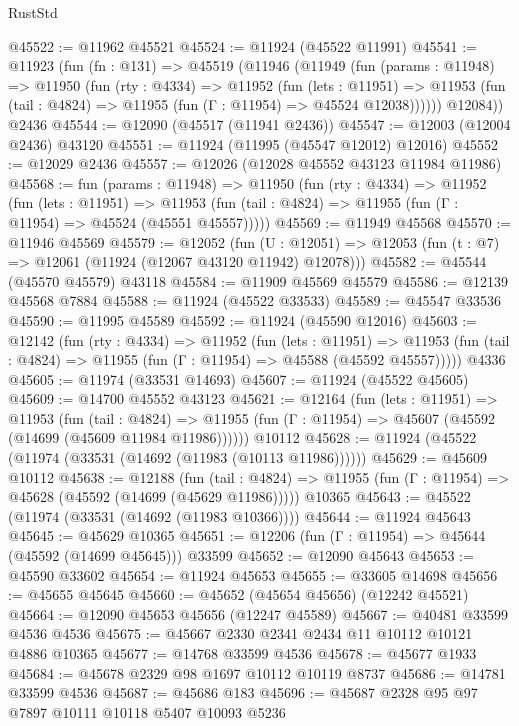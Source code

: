 \begin{lexlean}{RustStd}
\begin{coremodule}
{\begin{coremodule}
{{{{{{{{{{{{{{{{{{{{{{{{{{{{{{{{{{{{{{{{{{{{{{{{{{{{{{{{{{{{{{{{{{{{{{{{{{{{{{{{@45522 := @11962 @45521
@45524 := @11924 (@45522 @11991)
@45541 := @11923
    (fun (fn : @131) =>
    @45519
      (@11946
        (@11949
          (fun (params : @11948) =>
          @11950
            (fun (rty : @4334) =>
            @11952
              (fun (lets : @11951) =>
              @11953 (fun (tail : @4824) => @11955 (fun (Γ : @11954) => @45524 @12038))))))
        @12084))
    @2436
@45544 := @12090 (@45517 (@11941 @2436))
@45547 := @12003 (@12004 @2436) @43120
@45551 := @11924 (@11995 (@45547 @12012) @12016)
@45552 := @12029 @2436
@45557 := @12026 (@12028 @45552 @43123 @11984 @11986)
@45568 := fun (params : @11948) =>
  @11950
    (fun (rty : @4334) =>
    @11952
      (fun (lets : @11951) =>
      @11953 (fun (tail : @4824) => @11955 (fun (Γ : @11954) => @45524 (@45551 @45557)))))
@45569 := @11949 @45568
@45570 := @11946 @45569
@45579 := @12052
    (fun (U : @12051) => @12053 (fun (t : @7) => @12061 (@11924 (@12067 @43120 @11942) @12078)))
@45582 := @45544 (@45570 @45579) @43118
@45584 := @11909 @45569 @45579
@45586 := @12139 @45568 @7884
@45588 := @11924 (@45522 @33533)
@45589 := @45547 @33536
@45590 := @11995 @45589
@45592 := @11924 (@45590 @12016)
@45603 := @12142
    (fun (rty : @4334) =>
    @11952
      (fun (lets : @11951) =>
      @11953 (fun (tail : @4824) => @11955 (fun (Γ : @11954) => @45588 (@45592 @45557)))))
    @4336
@45605 := @11974 (@33531 @14693)
@45607 := @11924 (@45522 @45605)
@45609 := @14700 @45552 @43123
@45621 := @12164
    (fun (lets : @11951) =>
    @11953
      (fun (tail : @4824) =>
      @11955 (fun (Γ : @11954) => @45607 (@45592 (@14699 (@45609 @11984 @11986))))))
    @10112
@45628 := @11924 (@45522 (@11974 (@33531 (@14692 (@11983 (@10113 @11986))))))
@45629 := @45609 @10112
@45638 := @12188
    (fun (tail : @4824) => @11955 (fun (Γ : @11954) => @45628 (@45592 (@14699 (@45629 @11986)))))
    @10365
@45643 := @45522 (@11974 (@33531 (@14692 (@11983 @10366))))
@45644 := @11924 @45643
@45645 := @45629 @10365
@45651 := @12206 (fun (Γ : @11954) => @45644 (@45592 (@14699 @45645))) @33599
@45652 := @12090 @45643
@45653 := @45590 @33602
@45654 := @11924 @45653
@45655 := @33605 @14698
@45656 := @45655 @45645
@45660 := @45652 (@45654 @45656) (@12242 @45521)
@45664 := @12090 @45653 @45656 (@12247 @45589)
@45667 := @40481 @33599 @4536 @4536
@45675 := @45667 @2330 @2341 @2434 @11 @10112 @10121 @4886 @10365
@45677 := @14768 @33599 @4536
@45678 := @45677 @1933
@45684 := @45678 @2329 @98 @1697 @10112 @10119 @8737
@45686 := @14781 @33599 @4536
@45687 := @45686 @183
@45696 := @45687 @2328 @95 @97 @7897 @10111 @10118 @5407 @10093 @5236
}}}}}}}}}}}}}}}}}}}}}}}}}}}}}}}}}}}}}}}}}}}}}}}}}}}}}}}}}}}}}}}}}}}}}}}}}}}}}}}}
\end{coremodule}}
\end{coremodule}
\end{lexlean}
